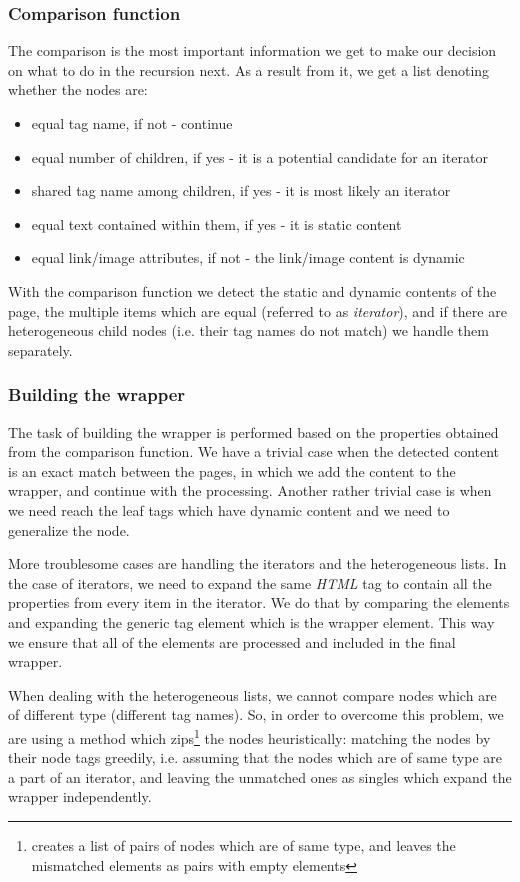\documentclass{article}
\begin{document}
	\subsubsection{Comparison function}
	The comparison is the most important information we get to make our decision on what to do in the recursion next. As a result from it, we get a list denoting whether the nodes are:
	\begin{itemize}
		\item equal tag name, if not - continue
		\item equal number of children, if yes - it is a potential candidate for an iterator
		\item shared tag name among children, if yes - it is most likely an iterator
		\item equal text contained within them, if yes - it is static content
		\item equal link/image attributes, if not - the link/image content is dynamic
	\end{itemize}
	With the comparison function we detect the static and dynamic contents of the page, the multiple items which are equal (referred to as \textit{iterator}), and if there are heterogeneous child nodes (i.e. their tag names do not match) we handle them separately.
	
	\subsubsection{Building the wrapper}
	The task of building the wrapper is performed based on the properties obtained from the comparison function. We have a trivial case when the detected content is an exact match between the pages, in which we add the content to the wrapper, and continue with the processing. Another rather trivial case is when we need reach the leaf tags which have dynamic content and we need to generalize the node. 
	
	More troublesome cases are handling the iterators and the heterogeneous lists. In the case of iterators, we need to expand the same \textit{HTML} tag to contain all the properties from every item in the iterator. We do that by comparing the elements and expanding the generic tag element which is the wrapper element. This way we ensure that all of the elements are processed and included in the final wrapper.
	
	When dealing with the heterogeneous lists, we cannot compare nodes which are of different type (different tag names). So, in order to overcome this problem, we are using a method which zips\footnote{creates a list of pairs of nodes which are of same type, and leaves the mismatched elements as pairs with empty elements} the nodes heuristically: matching the nodes by their node tags greedily, i.e. assuming that the nodes which are of same type are a part of an iterator, and leaving the unmatched ones as singles which expand the wrapper independently.
	
\end{document}
